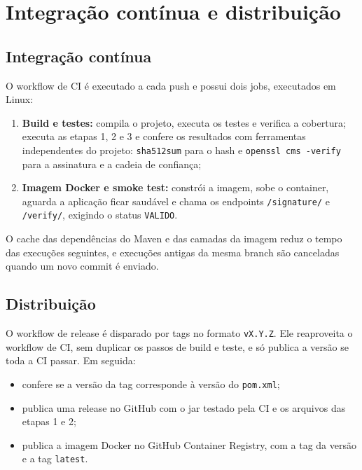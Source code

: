 \documentclass[12pt,a4paper]{article}
\begin{document}
\section{Integração contínua e distribuição}

\subsection{Integração contínua}

O workflow de CI é executado a cada push e possui dois jobs, executados em Linux:

\begin{enumerate}
    \item \textbf{Build e testes:} compila o projeto, executa os testes e verifica a cobertura; executa as etapas 1, 2 e 3 e confere os resultados com ferramentas independentes do projeto: \texttt{sha512sum} para o hash e \texttt{openssl cms -verify} para a assinatura e a cadeia de confiança;
    \item \textbf{Imagem Docker e smoke test:} constrói a imagem, sobe o container, aguarda a aplicação ficar saudável e chama os endpoints \texttt{/signature/} e \texttt{/verify/}, exigindo o status \texttt{VALIDO}.
\end{enumerate}

O cache das dependências do Maven e das camadas da imagem reduz o tempo das execuções seguintes, e execuções antigas da mesma branch são canceladas quando um novo commit é enviado.

\subsection{Distribuição}
\label{sec:distribuicao}

O workflow de release é disparado por tags no formato \texttt{vX.Y.Z}. Ele reaproveita o workflow de CI, sem duplicar os passos de build e teste, e só publica a versão se toda a CI passar. Em seguida:

\begin{itemize}
    \item confere se a versão da tag corresponde à versão do \texttt{pom.xml};
    \item publica uma release no GitHub com o jar testado pela CI e os arquivos das etapas 1 e 2;
    \item publica a imagem Docker no GitHub Container Registry, com a tag da versão e a tag \texttt{latest}.
\end{itemize}
\end{document}
